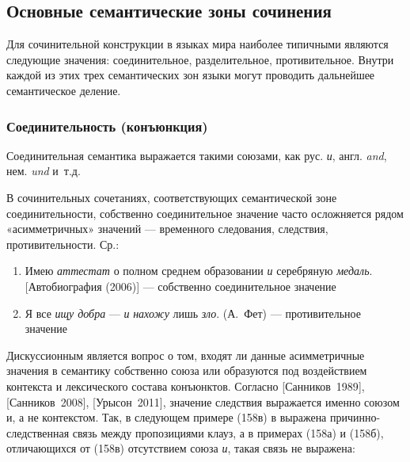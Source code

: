 \subsection{Основные семантические зоны
сочинения}\label{ux43eux441ux43dux43eux432ux43dux44bux435-ux441ux435ux43cux430ux43dux442ux438ux447ux435ux441ux43aux438ux435-ux437ux43eux43dux44b-ux441ux43eux447ux438ux43dux435ux43dux438ux44f}

Для сочинительной конструкции в языках мира наиболее типичными являются
следующие значения: соединительное, разделительное, противительное.
Внутри каждой из этих трех семантических зон языки могут проводить
дальнейшее семантическое деление.

\subsubsection{Соединительность
(конъюнкция)}\label{ux441ux43eux435ux434ux438ux43dux438ux442ux435ux43bux44cux43dux43eux441ux442ux44c-ux43aux43eux43dux44aux44eux43dux43aux446ux438ux44f}

Соединительная семантика выражается такими союзами, как рус. \textit{и},
англ. \textit{and}, нем. \textit{und} и~т.д.

В сочинительных сочетаниях, соответствующих семантической зоне
соединительности, собственно соединительное значение часто осложняется
рядом «асимметричных» значений --- временного следования, следствия,
противительности. Ср.:

\begin{enumerate}
\def\labelenumi{(\arabic{enumi})}
\setcounter{enumi}{155}
\item
  Имею \textit{аттестат} о полном среднем образовании \textit{и} серебряную
  \textit{медаль}. {[}Автобиография (2006){]} --- собственно соединительное
  значение
\item
  Я все \textit{ищу добра} --- \textit{и} \textit{нахожу} лишь \textit{зло}.
  (А.~Фет) --- противительное значение
\end{enumerate}

Дискуссионным является вопрос о том, входят ли данные асимметричные
значения в семантику собственно союза или образуются под воздействием
контекста и лексического состава конъюнктов. Согласно
{[}Санников~1989{]}, {[}Санников~2008{]}, {[}Урысон~2011{]}, значение
следствия выражается именно союзом и, а не контекстом. Так, в следующем
примере (158в) в выражена причинно-следственная связь между пропозициями
клауз, а в примерах (158а) и (158б), отличающихся от (158в) отсутствием
союза \textit{и}, такая связь не выражена:

